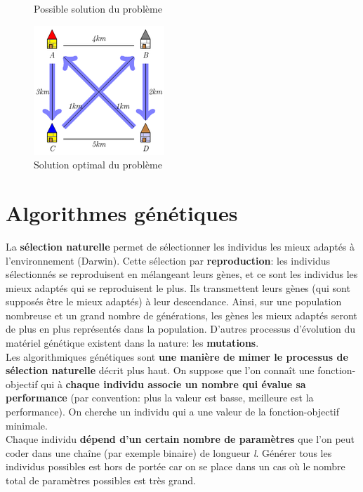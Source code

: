 \documentclass[12pt]{report}
\begin{document}
\begin{figure}[!htb]
  \caption{Possible solution du problème}\label{fig:pb2}
\endminipage\hfill
{}%
  \includegraphics[width=\linewidth]{img/pb3}
  \caption{Solution optimal du problème}\label{fig:pb3}
\endminipage
\end{figure}

\cleardoublepage
\chapter{Algorithmes génétiques}

La \textbf{sélection naturelle} permet de sélectionner les individus les mieux adaptés à l'environnement (Darwin). Cette sélection
par \textbf{reproduction}: les individus sélectionnés se reproduisent en mélangeant leurs gènes, et ce sont les individus les mieux 
adaptés qui se reproduisent le plus. Ils transmettent leurs gènes (qui sont supposés être le mieux adaptés) à leur descendance.
Ainsi, sur une population nombreuse et un grand nombre de générations, les gènes les mieux adaptés seront de plus en plus
représentés dans la population. D'autres processus d'évolution du matériel génétique existent dans la nature: les \textbf{mutations}. \\

Les algorithmiques génétiques sont \textbf{une manière de mimer le processus de sélection naturelle} décrit plus haut. On suppose que
l'on connaît une fonction-objectif qui à \textbf{chaque individu associe un nombre qui évalue sa performance} (par convention: plus 
la valeur est basse, meilleure est la performance). On cherche un individu qui a une valeur de la fonction-objectif minimale. \\
Chaque individu \textbf{dépend d'un certain nombre de paramètres} que l'on peut coder dans une chaîne (par exemple binaire) de longueur
\textit{l}. Générer tous les individus possibles est hors de portée car on se place dans un cas où le nombre total
de paramètres possibles est très grand.
\end{document}
